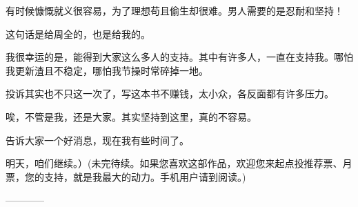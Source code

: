 \begin{this_body}
有时候慷慨就义很容易，为了理想苟且偷生却很难。男人需要的是忍耐和坚持！

这句话是给周全的，也是给我的。

我很幸运的是，能得到大家这么多人的支持。其中有许多人，一直在支持我。哪怕我更新渣且不稳定，哪怕我节操时常碎掉一地。

投诉其实也不只这一次了，写这本书不赚钱，太小众，各反面都有许多压力。

唉，不管是我，还是大家。其实坚持到这里，真的不容易。

告诉大家一个好消息，现在我有些时间了。

明天，咱们继续。）(未完待续。如果您喜欢这部作品，欢迎您来起点投推荐票、月票，您的支持，就是我最大的动力。手机用户请到阅读。)

------------

\end{this_body}

